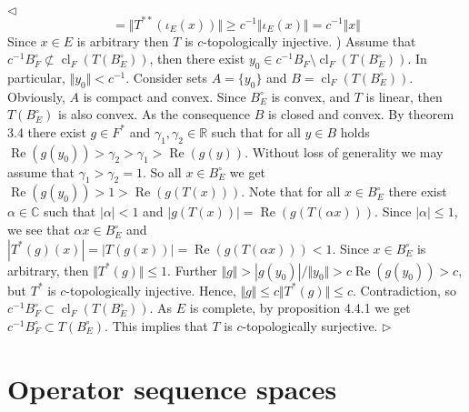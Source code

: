 \documentclass[12pt]{article}
\newenvironment{proof}{\par $\triangleleft$}{$\triangleright$}
\begin{document}
\begin{proof}
$$=\Vert T^{**}(\iota_E(x))\Vert
\geq c^{-1}\Vert \iota_E(x)\Vert
=c^{-1}\Vert x\Vert
$$
Since $x\in E$ is arbitrary then $ T$ is $c$-topologically injective.
) Assume that $c^{-1}B_F^\circ\not\subset\operatorname{cl}_F( T(B_E^\circ))$, then there exist $y_0\in c^{-1}B_F\setminus\operatorname{cl}_F( T(B_E^\circ))$. In particular, $\Vert y_0\Vert<c^{-1}$. Consider sets $A=\{y_0\}$ and 
$B=\operatorname{cl}_F( T(B_E^\circ))$. Obviously, $A$ is compact and convex. Since  $B_E^\circ$ is convex, and $ T$ is linear, then $ T(B_E^\circ)$ is also convex. As the consequence $B$ is closed and convex. By theorem 3.4 \cite{RudinFA}  there exist $g\in F^*$ and $\gamma_1,\gamma_2\in\mathbb{R}$ such that for all $y\in B$ holds $\operatorname{Re}(g(y_0))>\gamma_2>\gamma_1>\operatorname{Re}(g(y))$. Without loss of generality we may assume that $\gamma_1>\gamma_2=1$. So all $x\in B_E^\circ$ we get $\operatorname{Re}(g(y_0))>1>\operatorname{Re}(g( T(x)))$. Note that for all $x\in B_E^\circ$ there exist $\alpha\in\mathbb{C}$ 
such that $|\alpha|<1$ and $|g( T(x))|=\operatorname{Re}(g(T(\alpha x)))$. Since $|\alpha|\leq 1$, we see that $\alpha x\in B_E^\circ$ and $| T^*(g)(x)|=| T(g(x))|=\operatorname{Re}(g( T(\alpha x)))<1$. Since $x\in B_E^\circ$ 
is arbitrary, then $\Vert T^*(g)\Vert\leq 1$. Further $\Vert g\Vert>|g(y_0)|/\Vert y_0\Vert>c\operatorname{Re}(g(y_0))>c$, but $ T^*$ is $c$-topologically injective. Hence, 
$\Vert g\Vert\leq c\Vert T^*(g)\Vert\leq c$. Contradiction, so $c^{-1}B_F^\circ\subset \operatorname{cl}_F( 
T(B_E^\circ))$. As $E$ is complete, by proposition 4.4.1 \cite{HelFA} we get $c^{-1}B_F^\circ\subset T(B_E^\circ)$. This implies that $T$ is $c$-topologically surjective.
\end{proof}





























\section{Operator sequence spaces}
\end{document}
